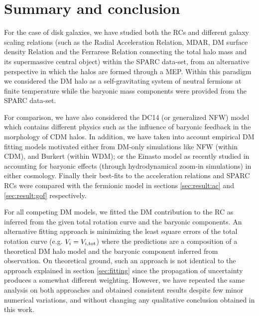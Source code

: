 \section{Summary and conclusion}
\label{sec:conclusion}

For the case of disk galaxies, we have studied both the RCs and different galaxy scaling relations (such as the Radial Acceleration Relation, MDAR, DM surface density Relation and the Ferrarese Relation connecting the total halo mass and its supermassive central object) within the SPARC data-set, from an alternative perspective in which the halos are formed through a MEP. Within this paradigm we considered the DM halo as a self-gravitating system of neutral fermions at finite temperature while the baryonic mass components were provided from the SPARC data-set. 

For comparison, we have also considered the DC14 (or generalized NFW) model which contains different physics such as the influence of baryonic feedback in the morphology of CDM halos. In addition, we have taken into account empirical DM fitting models motivated either from DM-only simulations like NFW (within CDM), and Burkert (within WDM); or the Einasto model as recently studied in \citet{2019MNRAS.483.4086B} accounting for baryonic effects (through hydrodynamical zoom-in simulations) in either cosmology. Finally their best-fits to the acceleration relations and SPARC RCs were compared with the fermionic model in sections \ref{sec:result:ac} and \ref{sec:result:gof} respectively.

For all competing DM models, we fitted the DM contribution to the RC as inferred from the given total rotation curve and the baryonic components. An alternative fitting approach is minimizing the least square errors of the total rotation curve (e.g. $V_i = V_{i, \rm tot}$) where the predictions are a composition of a theoretical DM halo model and the baryonic component inferred from observation. On theoretical ground, such an approach is not identical to the approach explained in section \ref{sec:fitting} since the propagation of uncertainty produces a somewhat different weighting. However, we have repeated the same analysis on both approaches and obtained consistent results despite few minor numerical variations, and without changing any qualitative conclusion obtained in this work.

